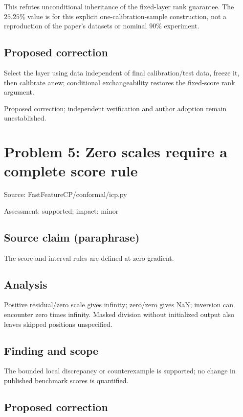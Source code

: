\documentclass[11pt]{article}
\begin{document}
This refutes unconditional inheritance of the fixed-layer rank guarantee. The \(25.25\%\) value is for this explicit one-calibration-sample construction, not a reproduction of the paper's datasets or nominal \(90\%\) experiment.

\subsection*{Proposed correction}

Select the layer using data independent of final calibration/test data, freeze it, then calibrate anew; conditional exchangeability restores the fixed-score rank argument.

Proposed correction; independent verification and author adoption remain unestablished.

\section*{Problem 5: Zero scales require a complete score rule}

Source: FastFeatureCP/conformal/icp.py

Assessment: supported; impact: minor

\subsection*{Source claim (paraphrase)}

The score and interval rules are defined at zero gradient.

\subsection*{Analysis}

Positive residual/zero scale gives infinity; zero/zero gives NaN; inversion can encounter zero times infinity. Masked division without initialized output also leaves skipped positions unspecified.

\subsection*{Finding and scope}

The bounded local discrepancy or counterexample is supported; no change in published benchmark scores is quantified.

\subsection*{Proposed correction}
\end{document}
